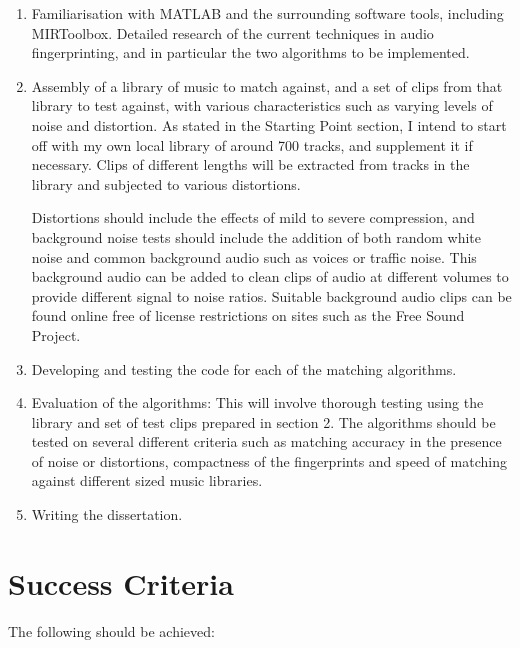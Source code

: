 \documentclass[12pt]{article}
\begin{document}
\begin{enumerate}

\item Familiarisation with MATLAB and the surrounding software tools, including MIRToolbox. Detailed research of the current techniques in audio fingerprinting, and in particular the two algorithms to be implemented. 

\item Assembly of a library of music to match against, and a set of clips from that library to test against, with various characteristics such as varying levels of noise and distortion. As stated in the Starting Point section, I intend to start off with my own local library of around 700 tracks, and supplement it if necessary. Clips of different lengths will be extracted from tracks in the library and subjected to various distortions.

Distortions should include the effects of mild to severe compression, and background noise tests should include the addition of both random white noise and common background audio such as voices or traffic noise. This background audio can be added to clean clips of audio at different volumes to provide different signal to noise ratios. Suitable background audio clips can be found online free of license restrictions on sites such as the Free Sound Project.

\item Developing and testing the code for each of the matching algorithms.

\item Evaluation of the algorithms: This will involve thorough testing using the library and set of test clips prepared in section 2. The algorithms should be tested on several different criteria such as matching accuracy in the presence of noise or distortions, compactness of the fingerprints and speed of matching against different sized music libraries.

\item Writing the dissertation.

\end{enumerate}


\section*{Success Criteria}

The following should be achieved:
\end{document}
